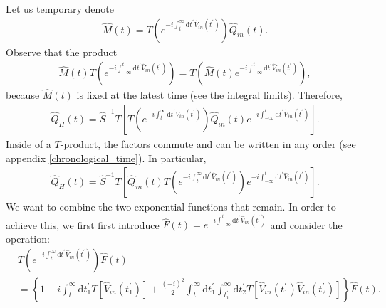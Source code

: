 \documentclass[12pt, titlepage]{article}
\begin{document}
Let us temporary denote 
\begin{equation}
\begin{split}
	\hat{M}(t) = T\left(
	e^{-i\int_{t}^{\infty}\mathrm{d}t^{\prime} \hat{V}_{in}(t^{\prime})}	
	\right)	
	\hat{Q}_{in}(t)	
	.
\end{split}
\end{equation}
Observe that the product 
\begin{equation}
\begin{split}
	\hat{M}(t)
T
\left( 
 e^{-i\int_{-\infty}^{t}\mathrm{d}t^{\prime} \hat{V}_{in}(t^{\prime})}
\right)	
	 = 	
	 T
\left( 
\hat{M}(t)
 e^{-i\int_{-\infty}^{t}\mathrm{d}t^{\prime} \hat{V}_{in}(t^{\prime})}
\right) 
	,
\end{split}
\end{equation}
because $ \hat{M}(t) $ is fixed at the latest time (see the integral limits). Therefore,
\begin{equation}
\begin{split}
\hat{Q}_{H}(t)
=
\hat{S}^{-1} 
T
\left[ 
T
\left( 
 e^{-i\int_{t}^{\infty}\mathrm{d}t^{\prime} \hat{V}_{in}(t^{\prime})}
\right)
\hat{Q}_{in}(t)
 e^{-i\int_{-\infty}^{t}\mathrm{d}t^{\prime} \hat{V}_{in}(t^{\prime})}
\right] 
	.
\end{split}
\end{equation}
Inside of a $ T $-product, the factors commute and can be written in any order (see appendix \ref{chronological_time}). In particular,
\begin{equation}\label{GML_v0.3}
\begin{split}
\hat{Q}_{H}(t)
=
\hat{S}^{-1} 
T
\left[ 
\hat{Q}_{in}(t)
T
\left( 
 e^{-i\int_{t}^{\infty}\mathrm{d}t^{\prime} \hat{V}_{in}(t^{\prime})}
\right)
 e^{-i\int_{-\infty}^{t}\mathrm{d}t^{\prime} \hat{V}_{in}(t^{\prime})}
\right] 
	.
\end{split}
\end{equation} 
We want to combine the two exponential functions that remain. In order to achieve this, we first first introduce $\hat{F}(t)
=
 e^{-i\int_{-\infty}^{t}\mathrm{d}t^{\prime} \hat{V}_{in}(t^{\prime})}
$ and consider the operation:
\begin{equation}\label{Moving_f_inside}
\begin{split}
& T
\left( 
 e^{-i\int_{t}^{\infty}\mathrm{d}t^{\prime} \hat{V}_{in}(t^{\prime})}
\right)
\hat{F}(t)
\\
&=
\left\lbrace 
1 
-
i
\int_{t}^{\infty}\mathrm{d}t^{\prime}_{1}
 T
 \left[ 
 \hat{V}_{in}(t^{\prime}_{1})
 \right] 
+
\frac{(-i)^{2}}{2}
\int_{t}^{\infty}\mathrm{d}t^{\prime}_{1}
\int_{t^{\prime}_{1}}^{\infty}\mathrm{d}t^{\prime}_{2}
 T
 \left[ 
 \hat{V}_{in}(t^{\prime}_{1})\hat{V}_{in}(t^{\prime}_{2})
 \right] 
\right\rbrace
\hat{F}(t)
.
\end{split}
\end{equation} 
\end{document}
